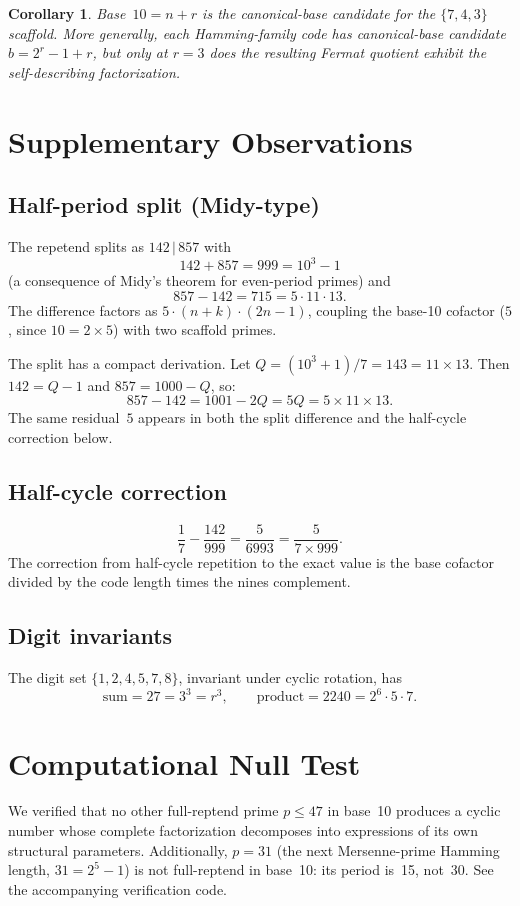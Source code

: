 \documentclass[11pt]{article}
\newtheorem{corollary}[theorem]{Corollary}
\theoremstyle{definition}
\theoremstyle{remark}
\begin{document}
\begin{corollary}
Base~$10 = n+r$ is the canonical-base candidate for the $\{7,4,3\}$
scaffold. More generally, each Hamming-family code has canonical-base
candidate $b = 2^r-1+r$, but only at $r=3$ does the resulting
Fermat quotient exhibit the self-describing factorization.
\end{corollary}

\section{Supplementary Observations}

\subsection{Half-period split (Midy-type)}
The repetend splits as $142\,|\,857$ with
\[
142+857 = 999 = 10^3-1
\]
(a consequence of Midy's theorem for even-period primes) and
\[
857-142 = 715 = 5 \cdot 11 \cdot 13.
\]
The difference factors as $5 \cdot (n+k) \cdot (2n-1)$, coupling the
base-10 cofactor ($5$, since $10=2\times5$) with two scaffold primes.

The split has a compact derivation. Let $Q = (10^3+1)/7 = 143 = 11
\times 13$. Then $142 = Q-1$ and $857 = 1000-Q$, so:
\[
857-142 = 1001 - 2Q = 5Q = 5 \times 11 \times 13.
\]
The same residual~$5$ appears in both the split difference and the
half-cycle correction below.

\subsection{Half-cycle correction}
\[
\frac{1}{7} - \frac{142}{999} = \frac{5}{6993} = \frac{5}{7 \times 999}.
\]
The correction from half-cycle repetition to the exact value is the
base cofactor divided by the code length times the nines complement.

\subsection{Digit invariants}
The digit set $\{1,2,4,5,7,8\}$, invariant under cyclic rotation, has
\[
\text{sum} = 27 = 3^3 = r^3, \qquad
\text{product} = 2240 = 2^6 \cdot 5 \cdot 7.
\]

\section{Computational Null Test}

We verified that no other full-reptend prime $p \leq 47$ in base~10
produces a cyclic number whose complete factorization decomposes into
expressions of its own structural parameters. Additionally, $p=31$
(the next Mersenne-prime Hamming length, $31=2^5-1$) is not
full-reptend in base~10: its period is~15, not~30. See the
accompanying verification code.
\end{document}
